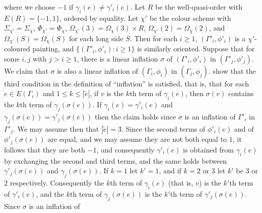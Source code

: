 where we choose $-1$ if $\gamma_i(e) \ne \gamma'_i(e)$. Let $R$ be the well-quasi-order with $E(R) = \{-1, 1\}$, ordered by equality. Let $\chi'$ be the colour scheme with $\Sigma_{\chi'} = \Sigma_\chi$, $\Phi_{\chi'} = \Phi_\chi$, $\Omega_{\chi'}(3) = \Omega_\chi(3) \times R$, $\Omega_{\chi'}(2) = \Omega_\chi(2)$, and $\Omega_{\chi'}(S) = \Omega_\chi(S)$ for each long side $S$. Then for each $i \ge 1$, $(\Gamma'_i, \phi'_i)$ is a $\chi'$-coloured painting, and $\{(\Gamma'_i, \phi'_i) : i \ge 1\}$ is similarly oriented. Suppose that for some $i, j$ with $j > i \ge 1$, there is a linear inflation $\sigma$ of $(\Gamma'_i, \phi'_i)$ in $(\Gamma'_j, \phi'_j)$. We claim that $\sigma$ is also a linear inflation of $(\Gamma_i, \phi_i)$ in $(\Gamma_j, \phi_j)$.    show that the third condition in the definition of ``inflation'' is satisfied, that is, that for each $e \in E(\Gamma_i)$ and $1 \le k \le |\tilde{e}|$, if $v$ is the $k$th term of $\gamma_i(e)$, then $\sigma(v)$ contains the $k$th term of $\gamma_j(\sigma(e))$. If $\gamma_i(e) = \gamma'_i(e)$ and $\gamma_j(\sigma(e)) = \gamma'_j(\sigma(e))$ then the claim holds since $\sigma$ is an inflation of $\Gamma'_i$ in $\Gamma'_j$. We may assume then that $|\tilde{e}| = 3$. Since the second terms of $\phi'_i(e)$ and of $\phi'_j(\sigma(e))$ are equal, and we may assume they are not both equal to $1$, it follows that they are both $-1$, and consequently $\gamma'_i(e)$ is obtained from $\gamma_i(e)$ by exchanging the second and third terms, and the same holds between $\gamma'_j(\sigma(e))$ and $\gamma_j(\sigma(e))$. If $k = 1$ let $k' = 1$, and if $k = 2$ or $3$ let $k'$ be $3$ or $2$ respectively. Consequently the $k$th term of $\gamma_i(e)$ (that is, $v$) is the $k'$th term of $\gamma'_i(e)$, and the $k$th term of $\gamma_j(\sigma(e))$ is the $k'$th term of $\gamma'_j(\sigma(e))$. Since $\sigma$ is an inflation of 